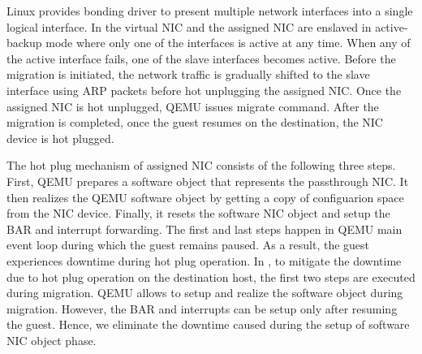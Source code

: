 Linux provides bonding driver to present multiple network
interfaces into a single logical interface. In \na the virtual
NIC and the assigned NIC are enslaved in active-backup mode
where only one of the interfaces is active at any time. When
any of the active interface fails, one of the slave interfaces
becomes active. Before the migration is initiated, the network
traffic is gradually shifted to the slave interface using ARP
packets before hot unplugging the assigned NIC. Once the
assigned NIC is hot unplugged, QEMU issues migrate command.
After the migration is completed, once the guest resumes on
the destination, the NIC device is hot plugged.

The hot plug mechanism of assigned NIC consists of the
following three steps. First, QEMU prepares a software object
that represents the passthrough NIC. It then realizes the QEMU
software object by getting a copy of configuarion space from
the NIC device. Finally, it resets the software NIC object and
setup the BAR and interrupt forwarding. The first and last
steps happen in QEMU main event loop during which the guest
remains paused. As a result, the guest experiences downtime
during hot plug operation. In \na, to mitigate the downtime
due to hot plug operation on the destination host, the first
two steps are executed during migration. QEMU allows to setup
and realize the software object during migration. However, the
BAR and interrupts can be setup only after resuming the guest.
Hence, we eliminate the downtime caused during the setup of
software NIC object phase.
